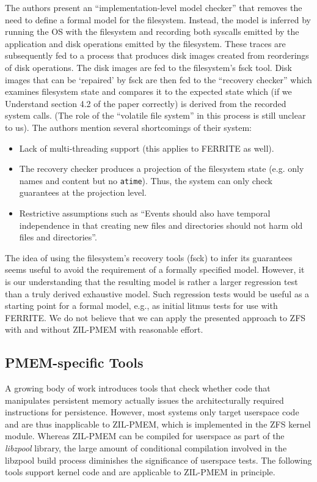 \documentclass[12pt,a4paper,twoside]{book}
\begin{document}
The authors present an “implementation-level model checker” that removes the need to define a formal model for the filesystem.
Instead, the model is inferred by running the OS with the filesystem and recording both syscalls emitted by the application and disk operations emitted by the filesystem.
These traces are subsequently fed to a process that produces disk images created from reorderings of disk operations.
The disk images are fed to the filesystem’s fsck tool.
Disk images that can be ‘repaired’ by fsck are then fed to the “recovery checker” which examines filesystem state and compares it to the expected state which (if we Understand section 4.2 of the paper correctly) is derived from the recorded system calls.
(The role of the “volatile file system” in this process is still unclear to us).
The authors mention several shortcomings of their system:
\begin{itemize}[noitemsep,beginpenalty=100000,midpenalty=100000]
    \item Lack of multi-threading support (this applies to FERRITE as well).
    \item The recovery checker produces a projection of the filesystem state (e.g. only names and content but no \lstinline{atime}).
          Thus, the system can only check guarantees at the projection level.
    \item Restrictive assumptions such as “Events should also have temporal independence in that creating new files and directories should not harm old files and directories”.
\end{itemize}
The idea of using the filesystem’s recovery tools (fsck) to infer its guarantees seems useful to avoid the requirement of a formally specified model.
However, it is our understanding that the resulting model is rather a larger regression test than a truly derived exhaustive model.
Such regression tests would be useful as a starting point for a formal model, e.g., as initial litmus tests for use with FERRITE.
We do not believe that we can apply the presented approach to ZFS with and without ZIL-PMEM with reasonable effort.

\subsection{PMEM-specific Tools}\label{sec:rel_work:pmemspecifictools}
A growing body of work introduces tools that check whether code that manipulates persistent memory actually issues the architecturally required instructions for persistence.
However, most systems only target userspace code and are thus inapplicable to ZIL-PMEM, which is implemented in the ZFS kernel module.
Whereas ZIL-PMEM can be compiled for userspace as part of the \textit{libzpool} library, the large amount of conditional compilation involved in the libzpool build process diminishes the significance of userspace tests.
The following tools support kernel code and are applicable to ZIL-PMEM in principle.
\end{document}
